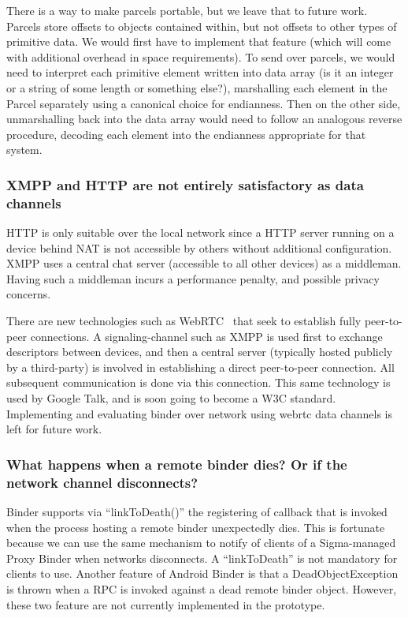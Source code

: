 \documentclass[prodmode]{acmlarge}
\begin{document}
There is a way to make parcels portable, but we leave that to future work. Parcels store offsets to objects contained within, but not offsets to other types of primitive data. We would first have to implement that feature (which will come with additional overhead in space requirements). To send over parcels, we would need to interpret each primitive element written into data array (is it an integer or a string of some length or something else?), marshalling each element in the Parcel separately using a canonical choice for endianness. Then on the other side, unmarshalling back into the data array would need to follow an analogous reverse procedure, decoding each element into the endianness appropriate for that system.

\subsubsection{XMPP and HTTP are not entirely satisfactory as data channels}
HTTP is only suitable over the local network since a HTTP server running on a device behind NAT is not accessible by others without additional configuration. XMPP uses a central chat server (accessible to all other devices) as a middleman. Having such a middleman incurs a performance penalty, and possible privacy concerns.

There are new technologies such as WebRTC~\cite{GoogleTalkLibrary} that seek to establish fully peer-to-peer connections. A signaling-channel such as XMPP is used first to exchange descriptors between devices, and then a central server (typically hosted publicly by a third-party) is involved in establishing a direct peer-to-peer connection. All subsequent communication is done via this connection. This same technology is used by Google Talk, and is soon going to become a W3C standard. Implementing and evaluating binder over network using webrtc data channels is left for future work.

\subsubsection{What happens when a remote binder dies? Or if the network channel disconnects?}
Binder supports via ``linkToDeath()'' the registering of callback that is invoked when the process hosting a remote binder unexpectedly dies. This is fortunate because we can use the same mechanism to notify of clients of a Sigma-managed Proxy Binder when networks disconnects. A ``linkToDeath'' is not mandatory for clients to use. Another feature of Android Binder is that a DeadObjectException is thrown when a RPC is invoked against a dead remote binder object. However, these two feature are not currently implemented in the prototype.
\end{document}
